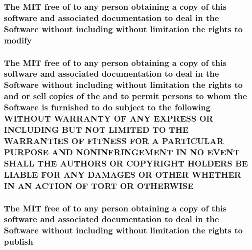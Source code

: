 \subsubsection[{modify}]{\setlength{\rightskip}{0pt plus 5cm}The M\+I\+T free of to any person obtaining a {\bf copy} of this software and associated documentation to deal in the {\bf Software} without including without limitation the rights to modify}\label{license_8txt_a4f5fee3fe655fc467fc80425521837ae}
\hypertarget{license_8txt_ae4c7c54aef6c135b4520f2237dbcf7c6}{}
\subsubsection[{O\+T\+H\+E\+R\+W\+I\+S\+E}]{\setlength{\rightskip}{0pt plus 5cm}The M\+I\+T free of to any person obtaining a {\bf copy} of this software and associated documentation to deal in the {\bf Software} without including without limitation the rights to and or sell copies of the and to permit persons to whom the {\bf Software} is furnished to do subject to the following W\+I\+T\+H\+O\+U\+T W\+A\+R\+R\+A\+N\+T\+Y O\+F A\+N\+Y E\+X\+P\+R\+E\+S\+S O\+R I\+N\+C\+L\+U\+D\+I\+N\+G B\+U\+T N\+O\+T L\+I\+M\+I\+T\+E\+D T\+O T\+H\+E W\+A\+R\+R\+A\+N\+T\+I\+E\+S O\+F F\+I\+T\+N\+E\+S\+S F\+O\+R A P\+A\+R\+T\+I\+C\+U\+L\+A\+R P\+U\+R\+P\+O\+S\+E A\+N\+D N\+O\+N\+I\+N\+F\+R\+I\+N\+G\+E\+M\+E\+N\+T I\+N N\+O E\+V\+E\+N\+T S\+H\+A\+L\+L T\+H\+E A\+U\+T\+H\+O\+R\+S O\+R C\+O\+P\+Y\+R\+I\+G\+H\+T H\+O\+L\+D\+E\+R\+S B\+E L\+I\+A\+B\+L\+E F\+O\+R A\+N\+Y D\+A\+M\+A\+G\+E\+S O\+R O\+T\+H\+E\+R W\+H\+E\+T\+H\+E\+R I\+N A\+N A\+C\+T\+I\+O\+N O\+F T\+O\+R\+T O\+R O\+T\+H\+E\+R\+W\+I\+S\+E}\label{license_8txt_ae4c7c54aef6c135b4520f2237dbcf7c6}
\hypertarget{license_8txt_ae6b6c4d3ae1a4140d31294e27bb0ebd8}{}
\subsubsection[{publish}]{\setlength{\rightskip}{0pt plus 5cm}The M\+I\+T free of to any person obtaining a {\bf copy} of this software and associated documentation to deal in the {\bf Software} without including without limitation the rights to publish}\label{license_8txt_ae6b6c4d3ae1a4140d31294e27bb0ebd8}
\hypertarget{license_8txt_ac0e1e4a858a6a19c5392f7f6d29f969c}{}
